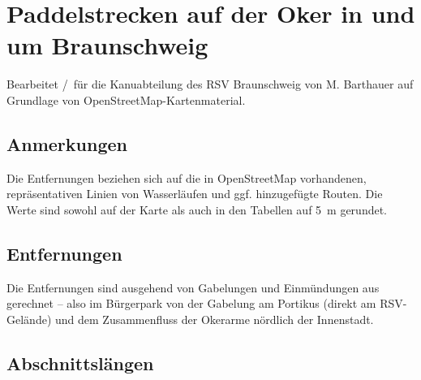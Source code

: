 \documentclass{article}
\begin{document}
    \section*{Paddelstrecken auf der Oker in und um Braunschweig} Bearbeitet
    \the\month/\the\year~für die Kanuabteilung des RSV Braunschweig von M.
    Barthauer auf Grundlage von OpenStreetMap-Kartenmaterial.
         
    \subsection*{Anmerkungen} Die Entfernungen beziehen sich auf die in
    OpenStreetMap vorhandenen, repräsentativen Linien von Wasserläufen und ggf.
    hinzugefügte Routen. Die Werte sind sowohl auf der Karte als auch in
    den Tabellen auf 5~m gerundet.
        
    \subsection*{Entfernungen} Die Entfernungen sind ausgehend von Gabelungen und
    Einmündungen aus gerechnet -- also im Bürgerpark von der Gabelung am
    Portikus (direkt am RSV-Gelände) und dem Zusammenfluss der Okerarme nördlich
    der Innenstadt. \\
    \begin{center}
    \end{center}
    
    \subsection*{Abschnittslängen}
    
    \begin{center}
    \end{center}    
   
    \listoffigures
    
\end{document}
